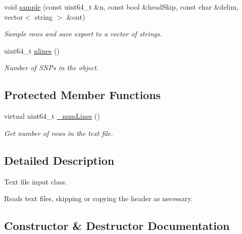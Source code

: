 \begin{DoxyCompactItemize}
void \hyperlink{classsamp_files_1_1_gtxt_file_i_afcdc7d04dfb617103080bc1db2822c84}{sample} (const uint64\+\_\+t \&n, const bool \&head\+Skip, const char \&delim, vector$<$ string $>$ \&out)
\begin{DoxyCompactList}\small\item\em Sample rows and save export to a vector of strings. \end{DoxyCompactList}\item 
\mbox{\label{classsamp_files_1_1_gtxt_file_i_a3da7d42ee1e48e302d776486d07204f3}} 
uint64\+\_\+t \hyperlink{classsamp_files_1_1_gtxt_file_i_a3da7d42ee1e48e302d776486d07204f3}{nlines} ()
\begin{DoxyCompactList}\small\item\em Number of S\+N\+Ps in the object. \end{DoxyCompactList}\end{DoxyCompactItemize}
\subsection*{Protected Member Functions}
\begin{DoxyCompactItemize}
\item 
virtual uint64\+\_\+t \hyperlink{classsamp_files_1_1_gtxt_file_i_a5452b2663b374cdaa6b6bd5f34683a3c}{\+\_\+num\+Lines} ()
\begin{DoxyCompactList}\small\item\em Get number of rows in the text file. \end{DoxyCompactList}\end{DoxyCompactItemize}


\subsection{Detailed Description}
Text file input class. 

Reads text files, skipping or copying the header as necessary. 

\subsection{Constructor \& Destructor Documentation}
\mbox{\label{classsamp_files_1_1_gtxt_file_i_aa41eb934d041edd06cee29d3e69f73da}} 
